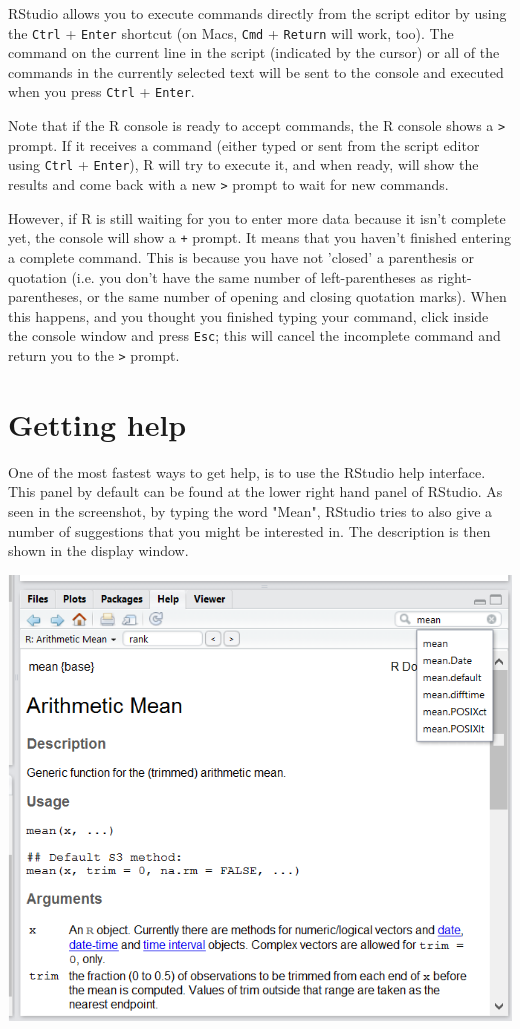 \documentclass[11pt]{article}
\begin{document}
RStudio allows you to execute commands directly from the script editor by using the \texttt{Ctrl} + \texttt{Enter} shortcut (on Macs, \texttt{Cmd} + \texttt{Return} will work, too). The command on the current line in the script (indicated by the cursor) or all of the commands in the currently selected text will be sent to the console and executed when you press \texttt{Ctrl} + \texttt{Enter}.

Note that if the R console is ready to accept commands, the R console shows a \texttt{>} prompt. If it receives a command (either typed or sent from the script editor using \texttt{Ctrl} + \texttt{Enter}), R will try to execute it, and when ready, will show the results and come back with a new \texttt{>} prompt to wait for new
commands.

However, if R is still waiting for you to enter more data because it isn't complete yet, the console will show a \texttt{+} prompt. It means that you haven't finished entering a complete command.  This is because you have not 'closed' a parenthesis or quotation (i.e. you don't have the same number of left-parentheses as right-parentheses, or the same number of opening and closing quotation marks).  When this happens, and you thought you finished typing your command, click inside the console window and press \texttt{Esc}; this will cancel the incomplete command and return you to the \texttt{>} prompt.

\section*{Getting help}
\label{sec-5}

One of the most fastest ways to get help, is to use the RStudio help interface. This panel by default can be found at the lower right hand panel of RStudio. As seen in the screenshot, by typing the word "Mean", RStudio tries to also give a number of suggestions that you might be interested in. The description is then shown in the display window.

\includegraphics[width=.9\linewidth]{figures/rstudiohelp.png}
\end{document}
